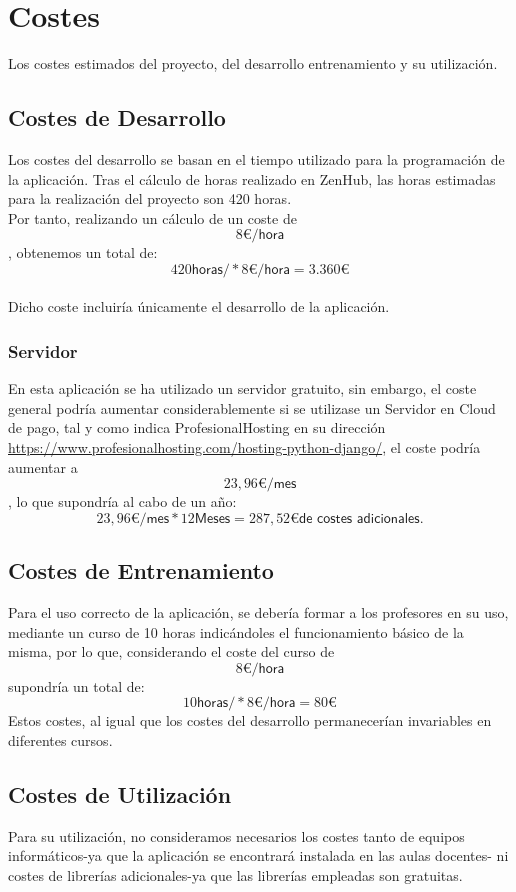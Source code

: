 \section{Costes}
Los costes estimados del proyecto, del desarrollo entrenamiento y su utilización. 
\subsection{Costes de Desarrollo}
Los costes del desarrollo se basan en el tiempo utilizado para la programación de la aplicación. Tras el cálculo de horas realizado en ZenHub, las horas estimadas para la realización del proyecto son 420 horas. \\Por tanto, realizando un cálculo de un coste de \[8{\euro{}}/\textsf{hora}\], obtenemos un total de: 
\[420\textsf{horas} /*8{\euro{}}/\textsf{hora}=3.360{\euro{}}\]
\\Dicho coste incluiría únicamente el desarrollo de la aplicación. 
\subsubsection{Servidor}
En esta aplicación se ha utilizado un servidor gratuito, sin embargo, el coste general podría aumentar considerablemente si se utilizase un Servidor en Cloud de pago, tal y como indica ProfesionalHosting en su dirección \url{https://www.profesionalhosting.com/hosting-python-django/}, el coste podría aumentar a \[23,96{\euro{}}/\textsf{mes}\], lo que supondría al cabo de un año: 
\[23,96{\euro{}} /\textsf{mes}*12\textsf{Meses}=287,52{\euro{}} \textsf{de costes adicionales.}\] 

\subsection{Costes de Entrenamiento}
Para el uso correcto de la aplicación, se debería formar a los profesores en su uso, mediante un curso de 10 horas indicándoles el funcionamiento básico de la misma, por lo que, considerando el coste del curso de \[8{\euro{}}/\textsf{hora}\] supondría un total de: 
\[10\textsf{horas} /*8{\euro{}}/\textsf{hora}=80{\euro{}}\]
Estos costes, al igual que los costes del desarrollo permanecerían invariables en diferentes cursos. 

\subsection{Costes de Utilización}
Para su utilización, no consideramos necesarios los costes tanto de equipos informáticos-ya que la aplicación se encontrará instalada en las aulas docentes- ni costes de librerías adicionales-ya que las librerías empleadas son gratuitas. 

